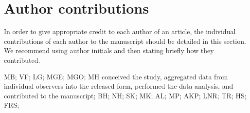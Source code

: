 \section*{Author contributions}
In order to give appropriate credit to each author of an article, the individual contributions of each author to the manuscript should be detailed in this section. We recommend using author initials and then stating briefly how they contributed.

MB;
VF;
LG;
MGE;
MGO;
MH conceived the study, aggregated data from individual observers into the released form, performed the data analysis, and contributed to the manuscript;
BH;
NH;
SK;
MK;
AL;
MP;
AKP;
LNR;
TR;
HS;
FRS;
